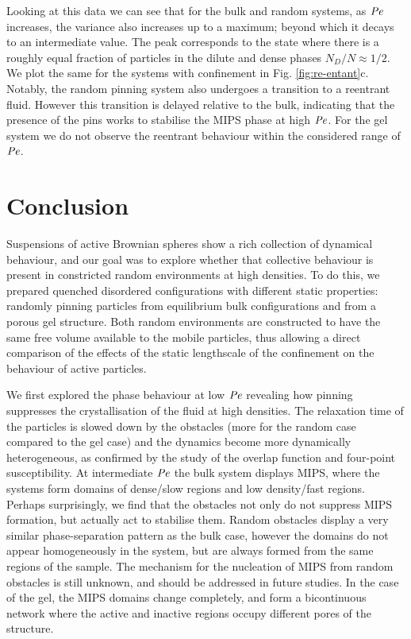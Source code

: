 Looking at this data we can see that for the bulk and random systems, as $\operatorname{\mathit{P\kern-.08em e}}$ increases, the variance also increases up to a maximum; beyond which it decays to an intermediate value. The peak corresponds to the state where there is a roughly equal fraction of particles in the dilute and dense phases $N_D / N \approx 1/2$. We plot the same for the systems with confinement in Fig. \ref{fig:re-entant}c. Notably, the random pinning system also undergoes a transition to a reentrant fluid. However this transition is delayed relative to the bulk, indicating that the presence of the pins works to stabilise the MIPS phase at high $\operatorname{\mathit{P\kern-.08em e}}$.
For the gel system we do not observe the reentrant behaviour within the considered range of $\operatorname{\mathit{P\kern-.08em e}}$.


\section{Conclusion}
\label{section:conclusion}
Suspensions of active Brownian spheres show a rich collection of dynamical behaviour, and our goal was to explore whether that collective behaviour is
present in constricted random environments at high densities. To do this, we prepared quenched disordered configurations with different static properties: randomly pinning particles from equilibrium bulk configurations and from a porous gel structure. Both random environments are constructed to have the same free volume available to the mobile particles, thus allowing a direct comparison of the effects of the static lengthscale of the confinement on the behaviour of active particles.

We first explored the phase behaviour at low $\operatorname{\mathit{P\kern-.08em e}}$ revealing how pinning suppresses the crystallisation of the fluid at high densities. The relaxation time of the particles is slowed down by the obstacles (more for the random case compared to the gel case) and the dynamics become more dynamically heterogeneous, as confirmed by the study of the overlap function and four-point susceptibility.
At intermediate $\operatorname{\mathit{P\kern-.08em e}}$ the bulk system displays MIPS, where the systems form domains of dense/slow regions and low density/fast regions. Perhaps surprisingly, we find that the obstacles not only do not suppress MIPS formation, but actually act to stabilise them.
Random obstacles display a very similar phase-separation pattern as the bulk case, however the domains do not appear homogeneously in the system, but are always formed from the same regions of the sample. The mechanism for the nucleation of MIPS from random obstacles is still unknown, and should be addressed in future studies.
In the case of the gel, the MIPS domains change completely, and form a bicontinuous network where the active and inactive regions occupy different pores of the structure.

